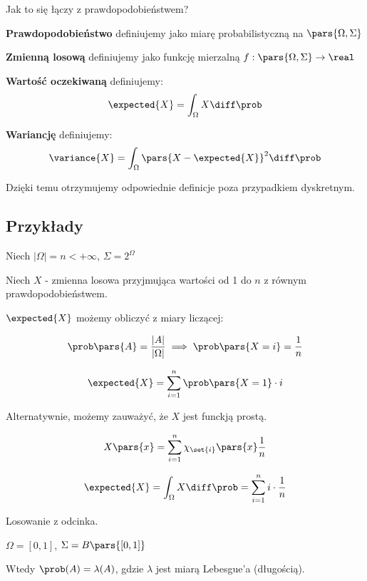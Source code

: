 \begin{corollary}

	Jak to się łączy z prawdopodobieństwem?

	\textbf{Prawdopodobieństwo} definiujemy jako miarę probabilistyczną na \( \pars{ \Omega, \Sigma } \)

	\textbf{Zmienną losową} definiujemy jako funkcję mierzalną \( f: \pars{ \Omega, \Sigma } \to \real \)

	\textbf{Wartość oczekiwaną} definiujemy:
	\[
		\expected{X} = \int_{\Omega} X \diff \prob
	\]

	\textbf{Wariancję} definiujemy:
	\[
		\variance{X} = \int_{\Omega} \pars{ X - \expected{X} }^2 \diff \prob
	\]

	Dzięki temu otrzymujemy odpowiednie definicje poza przypadkiem dyskretnym.
\end{corollary}

\subsection{Przykłady}

\begin{example}

	Niech \( \left| \Omega \right| = n < +\infty \), \( \Sigma = 2^{\Omega} \)

	Niech \( X \) - zmienna losowa przyjmująca wartości od 1 do \( n \) z równym prawdopodobieństwem.

	\( \expected{X} \) możemy obliczyć z miary liczącej:

	\[
		\prob \pars{ A } = \frac{ \left| A \right| }{ \left| \Omega \right| } \implies \prob \pars{ X = i } = \frac{1}{n}
	\]

	\[
		\expected{X} = \sum_{i = 1}^{n} \prob \pars{ X = 1 } \cdot i
	\]

	Alternatywnie, możemy zauważyć, że \( X \) jest funckją prostą.

	\[
		X \pars{ x } = \sum_{i = 1}^{n} \chi_{\set{ i }}\pars{ x } \frac{1}{n}
	\]

	\[
		\expected{X} = \int_{\Omega} X \diff \prob = \sum_{i=1}^{n} i \cdot \frac{1}{n}
	\]

\end{example}

\begin{example}
	Losowanie z odcinka.

	\( \Omega = [ 0, 1] \), \( \Sigma = B\pars{[0, 1] } \)

	Wtedy \( \prob(A) = \lambda(A) \), gdzie \( \lambda \) jest miarą Lebesgue'a (długością).

\end{example}

